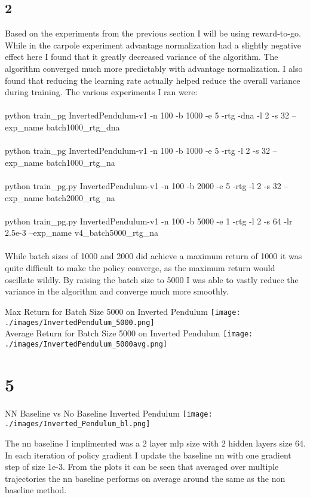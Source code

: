 \documentclass[12pt]{report}
\begin{document}
\subsection*{2}
Based on the experiments from the previous section I will be using reward-to-go. While in the carpole experiment advantage normalization had a slightly negative effect here I found that it greatly decreased variance of the algorithm. The algorithm converged much more predictably with advantage normalization. I also found that reducing the learning rate actually helped reduce the overall variance during training.
The various experiments I ran were:\\
\\
python train\_pg InvertedPendulum-v1 -n 100 -b 1000 -e 5 -rtg -dna -l 2 -s 32 --exp\_name batch1000\_rtg\_dna\\ \\
python train\_pg InvertedPendulum-v1 -n 100 -b 1000 -e 5 -rtg -l 2 -s 32 --exp\_name batch1000\_rtg\_na\\ \\
python train\_pg.py InvertedPendulum-v1 -n 100 -b 2000 -e 5 -rtg -l 2 -s 32 --exp\_name batch2000\_rtg\_na\\
\\
python train\_pg.py InvertedPendulum-v1 -n 100 -b 5000 -e 1 -rtg -l 2 -s 64 -lr 2.5e-3 --exp\_name v4\_batch5000\_rtg\_na\\
\\

While batch sizes of 1000 and 2000 did achieve a maximum return of 1000 it was quite difficult to make the policy converge, as the maximum return would oscillate wildly. By raising the batch size to 5000 I was able to vastly reduce the variance in the algorithm and converge much more smoothly.
\begin{center}
Max Return for Batch Size 5000 on Inverted Pendulum
\texttt{[image: ./images/InvertedPendulum\_5000.png]}
\\
Average Return for Batch Size 5000 on Inverted Pendulum
\texttt{[image: ./images/InvertedPendulum\_5000avg.png]}
\end{center}
\section*{5}
\begin{center}
NN Baseline vs No Baseline Inverted Pendulum
\texttt{[image: ./images/Inverted\_Pendulum\_bl.png]}
\end{center}
The nn baseline I implimented was a 2 layer mlp size with 2 hidden layers size 64. In each iteration of policy gradient I update the baseline nn with one gradient step of size 1e-3. From the plots it can be seen that averaged over multiple trajectories the nn baseline performs on average around the same as the non baseline method.
\end{document}
